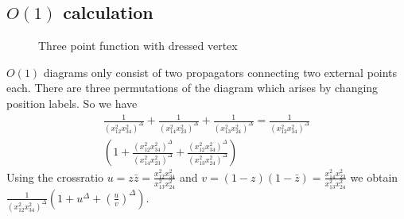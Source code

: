 \documentclass[12pt,a4paper,oneside]{book}
\theoremstyle{definition}
\begin{document}
    \subsection{$O(1)$ calculation}\label{tree}
    \begin{figure}
        \centering
        \caption{Three point function with dressed vertex}
    \end{figure}
    
        $O(1)$ diagrams only consist of two propagators connecting two external points each. There are three permutations of the diagram which arises by changing position labels. So we have 
        \begin{multline}
            \frac{1}{(x_{12}^2x_{34}^2)^{\Delta}} + \frac{1}{(x_{14}^2x_{23}^2)^{\Delta}} + \frac{1}{(x_{13}^2x_{24}^2)^{\Delta}} = \frac{1}{(x_{12}^2x_{34}^2)^{\Delta}}\\\left(1+\frac{(x_{12}^2x_{34}^2)^{\Delta}}{(x_{14}^2x_{23}^2)^{\Delta}}
            +\frac{(x_{12}^2x_{34}^2)^{\Delta}}{(x_{13}^2x_{24}^2)^{\Delta}} \right)
        \end{multline} 
        Using the crossratio $u = z\bar{z} = \frac{x_{12}^2x_{34}^2}{x_{13}^2x_{24}^2}$ and $v = (1-z)(1-\bar{z})= \frac{x_{14}^2x_{23}^2}{x_{13}^2x_{24}^2}$ we obtain $\frac{1}{(x_{12}^2x_{34}^2)^{\Delta}}\left(1+u^{\Delta}+(\frac{u}{v})^{\Delta}\right)$.
\end{document}
